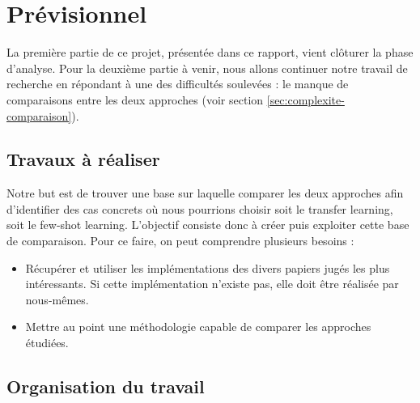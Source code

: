 \chapter{Prévisionnel}
\label{chap:prev}

La première partie de ce projet, présentée dans ce rapport, vient clôturer la phase  d'analyse. Pour la deuxième partie à venir, nous allons continuer notre travail de recherche en répondant à une des difficultés soulevées : le manque de comparaisons entre les deux approches (voir section \ref{sec:complexite-comparaison}).

\section{Travaux à réaliser}

Notre but est de trouver une base sur laquelle comparer les deux approches afin d'identifier des cas concrets où nous pourrions choisir soit le transfer learning, soit le few-shot learning. L'objectif consiste donc à créer puis exploiter cette base de comparaison. Pour ce faire, on peut comprendre plusieurs besoins :
\begin{itemize}
    \item Récupérer et utiliser les implémentations des divers papiers jugés les plus intéressants. Si cette implémentation n'existe pas, elle doit être réalisée par nous-mêmes.
    \item Mettre au point une méthodologie capable de comparer les approches étudiées.
\end{itemize}

\section{Organisation du travail}


\section{}